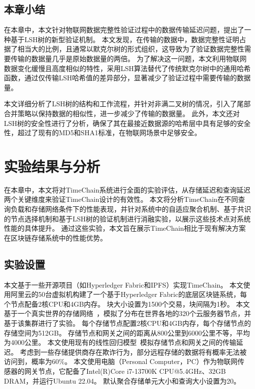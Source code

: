 \section{本章小结}
在本章中，本文针对物联网数据完整性验证过程中的数据传输延迟问题，提出了一种基于LSH树的新型验证机制。
本文发现，在传输的数据中，数据完整性证明占据了相当大的比例，且通常以默克尔树的形式组织，这导致为了验证数据完整性需要传输的数据量几乎是原始数据量的两倍。
为了解决这一问题，本文利用物联网数据变化缓慢且高度相似的特性，采用LSH算法替代了传统默克尔树中的通用哈希函数，通过仅传输LSH哈希值的差异部分，显著减少了验证过程中需要传输的数据量。

本文详细分析了LSH树的结构和工作流程，并针对非满二叉树的情况，引入了尾部合并策略以保持数据的相似性，进一步减少了传输的数据量。
此外，本文还对LSH树的安全性进行了分析，确保了其在最接近数据源的哈希层中具有足够的安全性，超过了现有的MD5和SHA1标准，在物联网场景中足够安全。

\chapter{实验结果与分析}
在本章中，本文将对TimeChain系统进行全面的实验评估，从存储延迟和查询延迟两个关键维度来验证TimeChain设计的有效性。
本文将分析TimeChain在不同查询负载和存储网络条件下的性能表现，并针对系统中的自适应聚合机制、基于共识的节点选择机制和基于LSH树的验证机制进行消融实验，以展示这些技术点对系统性能的具体提升。
通过这些实验，本文旨在展示TimeChain相比于现有解决方案在区块链存储系统中的性能优势。

\section{实验设置}
本文基于一些开源项目（如Hyperledger Fabric和IPFS）实现TimeChain。
本文使用阿里云的50台虚拟机构建了一个基于Hyperledger Fabric的底层区块链系统，每个节点配备2核CPU和4GB内存。
块大小设置为1500个交易，块间隔为1秒。
本文基于一个真实世界的存储网络~\cite{corneo2021surrounded}，模拟了分布在世界各地的320个云服务器节点，并基于该集群进行了实验。
每个存储节点配置2核CPU和4GB内存，每个存储节点的存储空间为512GB。
存储节点和网关之间的距离从800公里到6000公里不等，平均为4000公里。
本文使用现有的线性回归模型~\cite{ziviani2005improving}模拟存储节点和网关之间的传输延迟。
考虑到一些存储提供商存在欺诈行为，部分远程存储的数据将有概率无法被访问到，概率为60\%。
本文使用电脑（Personal Computer，PC）作为物联网传感器的网关节点，它配备了Intel(R)Core i7-13700K CPU@5.4GHz、32GB DRAM，并运行Ubuntu 22.04。
默认聚合存储单元大小和查询大小设置为20。

